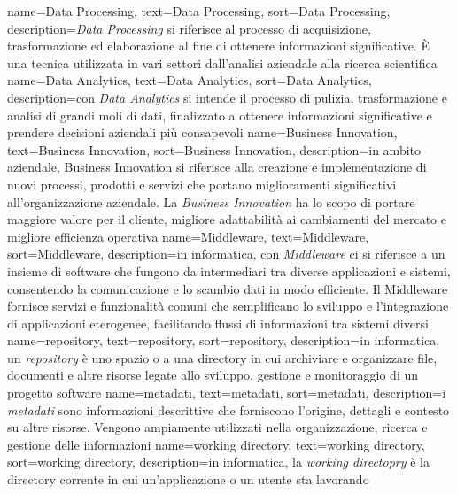 {
    name={Data Processing},
    text=Data Processing,
    sort=Data Processing,
    description={\textit{Data Processing} si riferisce al processo di acquisizione, trasformazione ed elaborazione al fine di 
    ottenere informazioni significative. È una tecnica utilizzata in vari settori dall'analisi aziendale alla ricerca scientifica}
}
{
    name={Data Analytics},
    text=Data Analytics,
    sort=Data Analytics,
    description={con \textit{Data Analytics} si intende il processo di pulizia, trasformazione e analisi di grandi moli di dati, finalizzato
    a ottenere informazioni significative e prendere decisioni aziendali più consapevoli}
}
{
    name={Business Innovation},
    text=Business Innovation,
    sort=Business Innovation,
    description={in ambito aziendale, Business Innovation si riferisce alla creazione e implementazione di nuovi processi, prodotti e servizi
    che portano miglioramenti significativi all'organizzazione aziendale. La \textit{Business Innovation} ha lo scopo di portare 
    maggiore valore per il cliente, migliore adattabilità ai cambiamenti del mercato e migliore efficienza operativa}
}
{
    name={Middleware},
    text=Middleware,
    sort=Middleware,
    description={in informatica, con \textit{Middleware} ci si riferisce a un insieme di software che fungono da intermediari tra diverse applicazioni 
    e sistemi, consentendo la comunicazione e lo scambio dati in modo efficiente. Il Middleware fornisce servizi e funzionalità comuni che 
    semplificano lo sviluppo e l'integrazione di applicazioni eterogenee, facilitando flussi di informazioni tra sistemi diversi}
}
{
    name={repository},
    text=repository,
    sort=repository,
    description={in informatica, un \textit{repository} è uno spazio o a una directory in cui archiviare e organizzare
    file, documenti e altre risorse legate allo sviluppo, gestione e monitoraggio di un progetto software}
}
{
    name={metadati},
    text=metadati,
    sort=metadati,
    description={i \textit{metadati} sono informazioni descrittive che forniscono l'origine, dettagli e contesto su altre risorse. Vengono ampiamente utilizzati 
    nella organizzazione, ricerca e gestione delle informazioni} 
}
{
    name={working directory},
    text=working directory,
    sort=working directory,
    description={in informatica, la \textit{working directopry} è la directory corrente in cui un'applicazione o un utente sta lavorando}
}
